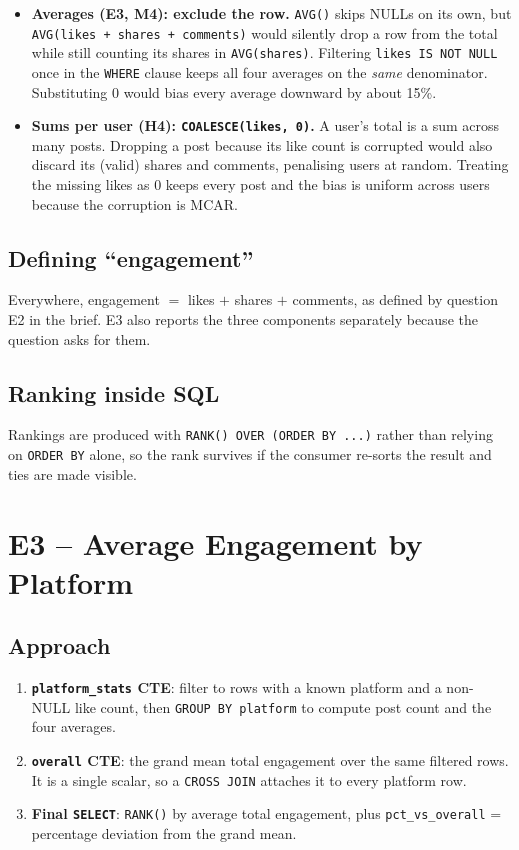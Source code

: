 \documentclass[11pt,a4paper]{article}
\begin{document}
\begin{itemize}[leftmargin=*]
  \item \textbf{Averages (E3, M4): exclude the row.} \texttt{AVG()} skips NULLs on its own, but \texttt{AVG(likes + shares + comments)} would silently drop a row from the total while still counting its shares in \texttt{AVG(shares)}. Filtering \texttt{likes IS NOT NULL} once in the \texttt{WHERE} clause keeps all four averages on the \emph{same} denominator. Substituting 0 would bias every average downward by about 15\%.
  \item \textbf{Sums per user (H4): \texttt{COALESCE(likes, 0)}.} A user's total is a sum across many posts. Dropping a post because its like count is corrupted would also discard its (valid) shares and comments, penalising users at random. Treating the missing likes as 0 keeps every post and the bias is uniform across users because the corruption is MCAR.
\end{itemize}

\subsection{Defining ``engagement''}

Everywhere, engagement $=$ likes $+$ shares $+$ comments, as defined by question E2 in the brief. E3 also reports the three components separately because the question asks for them.

\subsection{Ranking inside SQL}

Rankings are produced with \texttt{RANK() OVER (ORDER BY ...)} rather than relying on \texttt{ORDER BY} alone, so the rank survives if the consumer re-sorts the result and ties are made visible.

\section{E3 -- Average Engagement by Platform}

\subsection{Approach}
\begin{enumerate}[leftmargin=*]
  \item \textbf{\texttt{platform\_stats} CTE}: filter to rows with a known platform and a non-NULL like count, then \texttt{GROUP BY platform} to compute post count and the four averages.
  \item \textbf{\texttt{overall} CTE}: the grand mean total engagement over the same filtered rows. It is a single scalar, so a \texttt{CROSS JOIN} attaches it to every platform row.
  \item \textbf{Final \texttt{SELECT}}: \texttt{RANK()} by average total engagement, plus \texttt{pct\_vs\_overall} = percentage deviation from the grand mean.
\end{enumerate}
\end{document}
